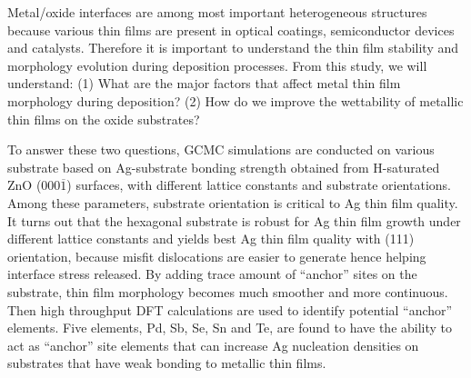 

\begin{comment}
\begingroup
\begin{figure}[!ht]
  \centering
  \subfigure[]{\texttt{[image: ]}}\label{Chap:Ag/ZnO:fig:}
  \subfigure[]{\texttt{[image: ]}}\label{Chap:Ag/ZnO:fig:}
\caption[]{}
  \label{Chap:Ag/ZnO:fig}
\end{figure}
\endgroup
\end{comment}


Metal/oxide interfaces are among most important heterogeneous structures because various thin films are present in optical coatings, semiconductor devices and catalysts. Therefore it is important to understand the thin film stability and morphology evolution during deposition processes. From this study, we will understand: (1) What are the major factors that affect metal thin film morphology during deposition? (2) How do we improve the wettability of metallic thin films on the oxide substrates?

To answer these two questions, \ac{GCMC} simulations are conducted on various substrate based on Ag-substrate bonding strength obtained from H-saturated ZnO (000$\overline{1}$) surfaces, with different lattice constants and substrate orientations. Among these parameters, substrate orientation is critical to Ag thin film quality. It turns out that the hexagonal substrate is robust for Ag thin film growth under different lattice constants and yields best Ag thin film quality with (111) orientation, because misfit dislocations are easier to generate hence helping interface stress released. 
By adding trace amount of ``anchor'' sites on the substrate, thin film morphology becomes much smoother and more continuous. Then high throughput \ac{DFT} calculations are used to identify potential ``anchor'' elements. Five elements, Pd, Sb, Se, Sn and Te, are found to have the ability to act as ``anchor'' site elements that can increase Ag nucleation densities on substrates that have weak bonding to metallic thin films.





